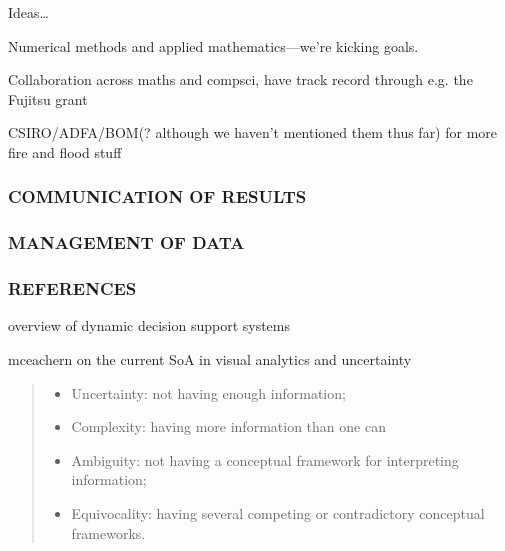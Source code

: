 \documentclass[a4paper,fontsize=12pt]{scrartcl}
\begin{document}
Ideas\ldots

Numerical methods and applied mathematics---we're kicking goals.

Collaboration across maths and compsci, have track record through e.g.
the Fujitsu grant

CSIRO/ADFA/BOM(? although we haven't mentioned them thus far) for more
fire and flood stuff

\subsubsection*{COMMUNICATION OF RESULTS}



\subsubsection*{MANAGEMENT OF DATA}



\subsubsection*{REFERENCES}

overview of dynamic decision support
systems\parencite{gonzalez_decision_2005}

mceachern on the current SoA in visual analytics and
uncertainty\cite{maceachren_visual_2015}


\blockquote[\cite{zack_role_2007}]{
  \begin{itemize}
  \item Uncertainty: not having enough information;
  \item Complexity: having more information than one can
  \item Ambiguity: not having a conceptual framework for interpreting
    information;
  \item Equivocality: having several competing or contradictory
    conceptual frameworks.
  \end{itemize}}
\end{document}
